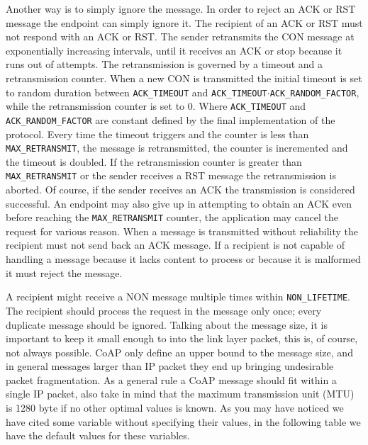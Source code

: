 	Another way is to simply ignore the message.\newline
	In order to reject an ACK or RST message the endpoint can simply ignore it.\newline
	The recipient of an ACK or RST must not respond with an ACK or RST.\newline
	The sender retransmits the CON message at exponentially increasing intervals, 
	until it receives an ACK or stop because it runs out of attempts.\newline
	The retransmission is governed by a timeout and a retransmission counter.\newline
	When a new CON is transmitted the initial timeout is set to random duration between
	\texttt{ACK\_TIMEOUT} 
	and \texttt{ACK\_TIMEOUT$\cdot$ACK\_RANDOM\_FACTOR}, while the retransmission counter is set to 0.\newline
	Where \texttt{ACK\_TIMEOUT} and \texttt{ACK\_RANDOM\_FACTOR} are constant defined by the final implementation of the protocol.\newline
	Every time the timeout triggers and the counter is less than \texttt{MAX\_RETRANSMIT}, the message is retransmitted, the counter is incremented and the timeout is doubled.\newline
	If the retransmission counter is greater than \texttt{MAX\_RETRANSMIT} or the sender receives a RST message the retransmission is aborted.
	Of course, if the sender receives an ACK the transmission is considered successful.\newline
	An endpoint may also give up in attempting to obtain an ACK even before reaching the \texttt{MAX\_RETRANSMIT} counter, the application may
	cancel the request for various reason.\newline
	When a message is transmitted without reliability the recipient must not send back an ACK message.\newline
	If a recipient is not capable of handling a message because it lacks content to process or because it is malformed it must reject
	the message.\newline
	
	A recipient might receive a NON message multiple times within \texttt{NON\_LIFETIME}.\newline
	The recipient should process the request in the message only once; every duplicate message should be ignored.\newline
	Talking about the message size, it is important to keep it small enough to into the link layer packet, this is, of course, not always possible.\newline
	CoAP only define an upper bound to the message size, and in general messages larger than IP packet they end up bringing undesirable packet fragmentation.\newline
	As a general rule a CoAP message should fit within a single IP packet, also take in mind that the maximum transmission unit (MTU) is 1280 byte if no other optimal values is known.\newline
	As you may have noticed we have cited some variable without specifying their values, in the following table we have the default values 
	for these variables.\newline
	
